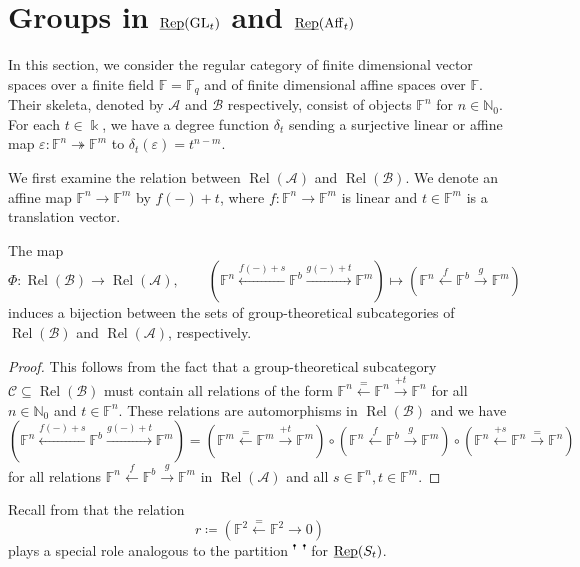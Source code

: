 \documentclass[11pt]{amsart}
\newcommand{\pd}[2][black]{\filldraw[#1] (#2) circle (1.5pt)} %
\newcommand\upperdots[1]{\tikz[baseline=(origin.base),scale=0.5]{
    \coordinate (origin) at (0,0);
    \foreach \i in {0,...,\numexpr#1-1\relax} {
        \pd{0.5*\i,.5};
        \draw (0.5*\i,.3) -- (0.5*\i,.5);
    }
}}
\newcommand\Cref[1]{\zcref[S]{#1}}
\theoremstyle{definition}
\theoremstyle{remark}
\newcommand\cA{\mathcal A}
\newcommand\cB{\mathcal B}
\newcommand\cC{\mathcal C}
\newcommand\kk{\Bbbk}
\newcommand\uRep{\underline{\smash{\operatorname{Rep}}}}
\renewcommand\:\colon
\newcommand\GL{\mathrm{GL}}
\newcommand\Aff{\mathrm{Aff}}
\newcommand\NN{\mathbb N}
\newcommand\FF{\mathbb F}
\renewcommand\:\colon
\newcommand\Rel{\operatorname{Rel}}
\newcommand\eps{\varepsilon}
\newcommand\tto{\twoheadrightarrow}
\begin{document}
\section{Groups in \texorpdfstring{$\uRep(\GL_t)$ and $\uRep(\Aff_t)$}{Rep(GLt) and Rep(Afft)}} \label{s:group-in-rep-glt}

In this section, we consider the regular category of finite dimensional vector spaces over a finite field $\FF = \FF_q$ and of finite dimensional affine spaces over $\FF$. Their skeleta, denoted by $\cA$ and $\cB$ respectively, consist of objects $\FF^n$ for $n \in \NN_0$. For each $t \in \kk$, we have a degree function $\delta_t$ sending a surjective linear or affine map $\eps: \FF^n \tto \FF^m$ to $\delta_t(\eps) = t^{n-m}$.

We first examine the relation between $\Rel(\cA)$ and $\Rel(\cB)$. We denote an affine map $\FF^n \to \FF^m$ by $f(-)+t$, where $f: \FF^n \to \FF^m$ is linear and $t \in \FF^m$ is a translation vector.

\begin{lemma} \label{l:bijection-rela-relb}
    The map
    \[
        \Phi: \Rel(\cB) \longrightarrow \Rel(\cA), \qquad \left(\FF^n \xleftarrow{f(-)+s} \FF^b \xrightarrow{g(-)+t} \FF^m\right) \longmapsto \left(\FF^n \xleftarrow{f} \FF^b \xrightarrow{g} \FF^m\right)
    \]
    induces a bijection between the sets of group-theoretical subcategories of $\Rel(\cB)$ and $\Rel(\cA)$, respectively.
\end{lemma}
\begin{proof}
    This follows from the fact that a group-theoretical subcategory $\cC \subseteq \Rel(\cB)$ must contain all relations of the form $\FF^n \xleftarrow{=} \FF^n \xrightarrow{+t} \FF^n$ for all $n \in \NN_0$ and $t \in \FF^n$. These relations are automorphisms in $\Rel(\cB)$ and we have
    \[
        \left(\FF^n \xleftarrow{f(-)+s} \FF^b \xrightarrow{g(-)+t} \FF^m\right) = 
        \left(\FF^m \xleftarrow{=} \FF^m \xrightarrow{+t} \FF^m\right) \circ
        \left(\FF^n \xleftarrow{f} \FF^b \xrightarrow{g} \FF^m\right) \circ
        \left(\FF^n \xleftarrow{+s} \FF^n \xrightarrow{=} \FF^n\right)
    \]
    for all relations $\FF^n \xleftarrow{f} \FF^b \xrightarrow{g} \FF^m$ in $\Rel(\cA)$ and all $s \in \FF^n, t \in \FF^m$.
\end{proof}

Recall from \Cref{ss:one-atom} that the relation
\[
    r \coloneqq \left(\FF^2 \xleftarrow{=} \FF^2 \to 0\right)
\]
plays a special role analogous to the partition $\upperdots{2}$ for $\uRep(S_t)$.
\end{document}
